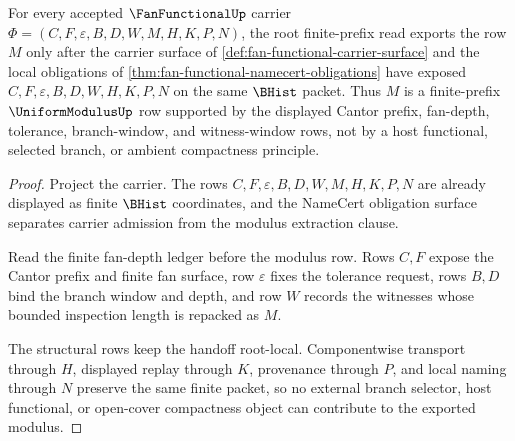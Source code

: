 \begin{theorem}
\label{thm:fan-functional-root-finite-prefix-uniform-modulus}
For every accepted $\FanFunctionalUp$ carrier $\Phi=(C,F,\varepsilon,B,D,W,M,H,K,P,N)$, the root finite-prefix read exports the row $M$ only after the carrier surface of \autoref{def:fan-functional-carrier-surface} and the local obligations of \autoref{thm:fan-functional-namecert-obligations} have exposed $C,F,\varepsilon,B,D,W,H,K,P,N$ on the same $\BHist$ packet. Thus $M$ is a finite-prefix $\UniformModulusUp$ row supported by the displayed Cantor prefix, fan-depth, tolerance, branch-window, and witness-window rows, not by a host functional, selected branch, or ambient compactness principle.
\end{theorem}
\begin{proof}
Project the carrier. The rows $C,F,\varepsilon,B,D,W,M,H,K,P,N$ are already displayed as finite $\BHist$ coordinates, and the NameCert obligation surface separates carrier admission from the modulus extraction clause.

Read the finite fan-depth ledger before the modulus row. Rows $C,F$ expose the Cantor prefix and finite fan surface, row $\varepsilon$ fixes the tolerance request, rows $B,D$ bind the branch window and depth, and row $W$ records the witnesses whose bounded inspection length is repacked as $M$.

The structural rows keep the handoff root-local. Componentwise transport through $H$, displayed replay through $K$, provenance through $P$, and local naming through $N$ preserve the same finite packet, so no external branch selector, host functional, or open-cover compactness object can contribute to the exported modulus.
\end{proof}

